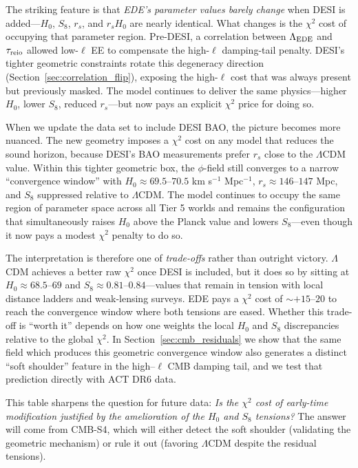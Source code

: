 \documentclass[a4paper,11pt]{article}
\begin{document}
The striking feature is that \emph{EDE's parameter values barely change} when DESI is added---$H_0$, $S_8$, $r_s$, and $r_s H_0$ are nearly identical. What changes is the $\chi^2$ cost of occupying that parameter region. Pre-DESI, a correlation between $\Lambda_{\rm EDE}$ and $\tau_{\rm reio}$ allowed low-$\ell$ EE to compensate the high-$\ell$ damping-tail penalty. DESI's tighter geometric constraints rotate this degeneracy direction (Section~\ref{sec:correlation_flip}), exposing the high-$\ell$ cost that was always present but previously masked. The model continues to deliver the same physics---higher $H_0$, lower $S_8$, reduced $r_s$---but now pays an explicit $\chi^2$ price for doing so.

When we update the data set to include DESI BAO, the picture becomes more nuanced. The new geometry imposes a $\chi^2$ cost on any model that reduces the sound horizon, because DESI's BAO measurements prefer $r_s$ close to the $\Lambda$CDM value. Within this tighter geometric box, the $\phi$-field still converges to a narrow ``convergence window'' with $H_0 \approx 69.5$--$70.5$ km s$^{-1}$ Mpc$^{-1}$, $r_s \approx 146$--$147$ Mpc, and $S_8$ suppressed relative to $\Lambda$CDM. The model continues to occupy the same region of parameter space across all Tier 5 worlds and remains the configuration that simultaneously raises $H_0$ above the Planck value and lowers $S_8$---even though it now pays a modest $\chi^2$ penalty to do so.

The interpretation is therefore one of \emph{trade-offs} rather than outright victory. $\Lambda$CDM achieves a better raw $\chi^2$ once DESI is included, but it does so by sitting at $H_0 \approx 68.5$--$69$ and $S_8 \approx 0.81$--$0.84$---values that remain in tension with local distance ladders and weak-lensing surveys. EDE pays a $\chi^2$ cost of $\sim +15$--$20$ to reach the convergence window where both tensions are eased. Whether this trade-off is ``worth it'' depends on how one weights the local $H_0$ and $S_8$ discrepancies relative to the global $\chi^2$. In Section~\ref{sec:cmb_residuals} we show that the same field which produces this geometric convergence window also generates a distinct ``soft shoulder'' feature in the high--$\ell$ CMB damping tail, and we test that prediction directly with ACT DR6 data.

This table sharpens the question for future data: \emph{Is the $\chi^2$ cost of early-time modification justified by the amelioration of the $H_0$ and $S_8$ tensions?} The answer will come from CMB-S4, which will either detect the soft shoulder (validating the geometric mechanism) or rule it out (favoring $\Lambda$CDM despite the residual tensions).
\end{document}
